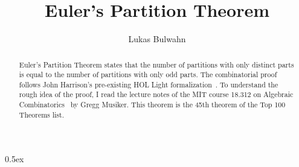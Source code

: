 \documentclass[11pt,a4paper]{article}
\begin{document}
\title{Euler's Partition Theorem}
\author{Lukas Bulwahn}
\maketitle

\begin{abstract}
Euler's Partition Theorem states that the number of partitions with only
distinct parts is equal to the number of partitions with only odd parts.
The combinatorial proof follows John Harrison's pre-existing HOL Light
formalization~\cite{Harrison}.
To understand the rough idea of the proof, I read the lecture notes of
the MIT course 18.312 on Algebraic Combinatorics~\cite{Musiker-2009}
by Gregg Musiker.
This theorem is the 45th theorem of the Top 100 Theorems list.

\end{abstract}

\tableofcontents

\parindent 0pt\parskip 0.5ex





\end{document}
